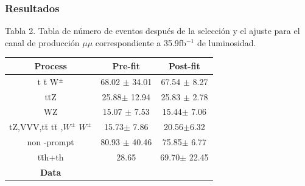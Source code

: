 \documentclass[11pt]{beamer}
\begin{document}
\begin{frame}
\frametitle{Resultados}
\begin{center}
	
	Tabla 2. Tabla de  n\'umero de eventos despu\'es de la selecci\'on y el ajuste para el canal de producci\'on $\mu\mu$ correspondiente a 35.9fb$^{-1}$ de luminosidad.\\ 
	
\scriptsize{
	\begin{tabular}{ccc}
		\hline
		Process & Pre-fit & Post-fit \\
		\hline
		t \={t} W$^{\pm}$ & 68.02 $\pm$ 34.01 &67.54 $\pm$ 8.27 \\
		t\={t}Z &	25.88$ \pm$ 12.94 &  25.83 $\pm$ 2.78\\
		WZ 	&	15.07 $\pm$ 7.53 & 15.44$\pm$ 7.06 \\
		tZ,VVV,t\={t} t\={t} ,$W^{\pm}$ $W^{\pm}$ & 15.73$\pm$ 7.86 &  20.56$\pm$6.32\\
		non -prompt    &   80.93 $\pm$ 40.46 & 75.85$\pm$ 6.77\\
		t\={t}h+th 		&	28.65 & 69.70$\pm$ 22.45\\
		\textbf{Data}\quad 280 &	&  
	\end{tabular}
}
\end{center}

\end{frame}


\end{document}
